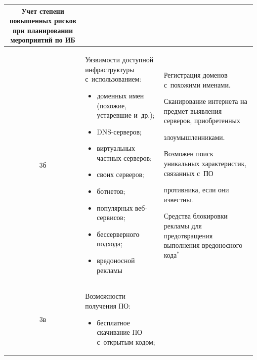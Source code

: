 \begin{table}
\begin{center}
\begin{tabular}{|c|p{66mm}|p{50mm}|}
Учет степени повышенных рисков при планировании мероприятий по ИБ\\

\hline

3б&Уязвимости доступной инфраструктуры с~использованием:\vspace*{-6pt} 

\begin{itemize}

\addtolength{\itemsep}{-6pt}

\item доменных имен (похожие, устаревшие и~др.);

\item DNS-серверов;

\item виртуальных частных серверов;

\item своих серверов;

\item ботнетов;

\item популярных веб-сер\-ви\-сов;

\item бессерверного подхода;

\item вредоносной рекламы\vspace*{-6pt}

\end{itemize}&Регистрация доменов с~похожими именами.\newline

Сканирование интернета на предмет выявления серверов, приобретенных 

злоумышленниками.\newline

Возможен поиск уникальных характеристик, связанных с~ПО

противника, если они известны.\newline

Средства блокировки рекламы для предот\-вра\-ще\-ния выполнения вредоносного кода$^{*}$\\

\hline

3в&Возможности получения ПО:\vspace*{-6pt}

\begin{itemize}

\addtolength{\itemsep}{-6pt}

\item бесплатное скачивание ПО с~открытым кодом;


\end{itemize}
\end{tabular}
\end{center}
\end{table}
